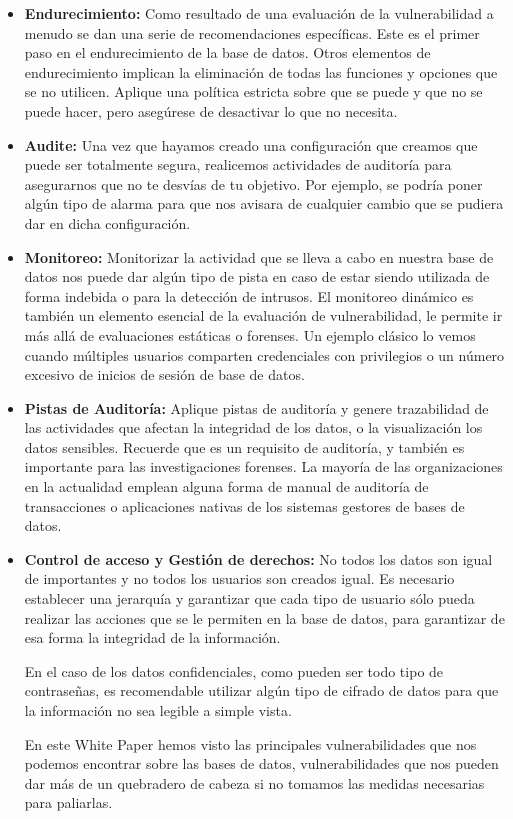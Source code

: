 \documentclass[%
 reprint,
 amsmath,amssymb,
 aps,
]{revtex4-1}
\begin{document}
\begin{itemize}
	\item \textbf{Endurecimiento: }Como resultado de una evaluación de la vulnerabilidad a menudo se dan una serie de recomendaciones específicas. Este es el primer paso en el endurecimiento de la base de datos. Otros elementos de endurecimiento implican la eliminación de todas las funciones y opciones que se no utilicen. Aplique una política estricta sobre que se puede y que no se puede hacer, pero asegúrese de desactivar lo que no necesita.
	\item \textbf{Audite: }Una vez que hayamos creado una configuración que creamos que puede ser totalmente segura, realicemos
actividades de auditoría para asegurarnos que no te desvías de tu objetivo. Por ejemplo, se podría poner
algún tipo de alarma para que nos avisara de cualquier cambio que se pudiera dar en dicha configuración.
	\item \textbf{Monitoreo:} Monitorizar la actividad que se lleva a cabo en nuestra base de datos nos puede dar algún tipo de pista en
caso de estar siendo utilizada de forma indebida o para la detección de intrusos.
El monitoreo dinámico es también un elemento esencial de la evaluación de vulnerabilidad, le permite ir más allá de evaluaciones estáticas o forenses. Un ejemplo clásico lo vemos cuando múltiples usuarios comparten credenciales con privilegios o un número excesivo de inicios de sesión de base de datos.
	\item \textbf{Pistas de Auditoría: }Aplique pistas de auditoría y genere trazabilidad de las actividades que afectan la integridad de los datos, o la visualización los datos sensibles.
Recuerde que es un requisito de auditoría, y también es importante para las investigaciones forenses.
La mayoría de las organizaciones en la actualidad emplean alguna forma de manual de auditoría de transacciones o aplicaciones nativas de los sistemas gestores de bases de datos. 
	\item \textbf{ Control de acceso y Gestión de derechos: }No todos los datos son igual de importantes y no todos los usuarios son creados igual. Es necesario
establecer una jerarquía y garantizar que cada tipo de usuario sólo pueda realizar las acciones que se le
permiten en la base de datos, para garantizar de esa forma la integridad de la información.
\par En el caso de los datos confidenciales, como pueden ser todo tipo de contraseñas, es recomendable utilizar
algún tipo de cifrado de datos para que la información no sea legible a simple vista.
\par  En este White Paper hemos visto las principales vulnerabilidades que nos podemos encontrar sobre las
bases de datos, vulnerabilidades que nos pueden dar más de un quebradero de cabeza si no tomamos las
medidas necesarias para paliarlas. \cite{ff}

\end{itemize}
\end{document}
